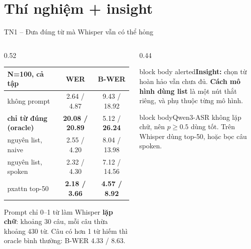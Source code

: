 \documentclass[aspectratio=169,xcolor=table]{beamer}
\newcommand{\hi}[1]{\textcolor{Primary}{\textbf{#1}}}
\newcommand{\bad}[1]{\textcolor{RiskRed}{\textbf{#1}}}
\newcommand{\good}[1]{\textcolor{GoodGreen}{\textbf{#1}}}
\newcommand{\nbox}[2][block body]{\begin{beamercolorbox}[sep=0.45em,rounded=true]{#1}\footnotesize #2\end{beamercolorbox}}
\begin{document}
\section{Thí nghiệm + insight}
\begin{frame}{TN1 -- Đưa đúng từ mà Whisper vẫn có thể hỏng}
\begin{columns}[T]
\begin{column}{0.52\textwidth}
\centering\footnotesize\setlength{\tabcolsep}{3pt}
\begin{tabular}{lcc}
\toprule
N=100, cả tập & WER & B-WER\\
\midrule
không prompt & 2.64 / 4.87 & 9.43 / 18.92\\
\textbf{chỉ từ đúng (oracle)} & \bad{20.08 / 20.89} & 5.12 / \bad{26.24}\\
nguyên list, naive & 2.55 / 4.20 & 8.04 / 13.98\\
nguyên list, spoken & 2.32 / 4.30 & 7.12 / 14.56\\
pxattn top-50 & \good{2.18 / 3.66} & \good{4.57 / 8.92}\\
\bottomrule
\end{tabular}\par
\vspace{0.2cm}\raggedright
{\footnotesize Prompt chỉ 0--1 từ làm Whisper \textbf{lặp chữ}: khoảng 30 câu, mỗi câu thừa khoảng 430 từ. Câu có hơn 1 từ hiếm thì oracle bình thường: B-WER 4.33 / 8.63.}
\end{column}
\begin{column}{0.44\textwidth}
\nbox[block body alerted]{\textbf{Insight:} chọn từ hoàn hảo vẫn chưa đủ. \hi{Cách mô hình dùng list} là một nút thắt riêng, và phụ thuộc từng mô hình.}
\vspace{0.12cm}
\nbox{Qwen3-ASR không lặp chữ, nên $p\geq0.5$ dùng tốt. Trên Whisper dùng top-50, hoặc bọc câu spoken.}
\end{column}
\end{columns}
\end{frame}
\end{document}
